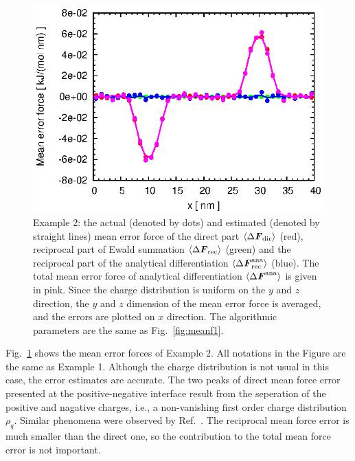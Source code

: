 \documentclass[aps,pre,preprint]{revtex4}
\renewcommand{\v}[1]{\textbf{\textit{#1}}}
\begin{document}
\begin{figure}
  \centering
  \includegraphics[]{fig/error.two_peaks_sep.box40x20x20.b1.000.r3.00.n6.K101x051x051/fig.ana.ewald.meanf.eps}
  \caption{Example 2: the actual (denoted by dots) and estimated
    (denoted by straight lines) mean error force of the direct part
    $\langle\Delta \v F_{\textrm{dir}}\rangle$ (red), reciprocal part
    of Ewald summation $\langle\Delta \v F_{\textrm{rec}}\rangle$
    (green) and the reciprocal part of the analytical differentiation
    $\langle\Delta \v F^{\textrm{ana}}_{\textrm{rec}}\rangle$
    (blue). The total mean error force of analytical differentiation
    $\langle\Delta \v F^{\textrm{ana}}\rangle$ is given in pink.
    Since the charge distribution is uniform on the $y$ and $z$
    direction, the $y$ and $z$ dimension of the mean error force is
    averaged, and the errors are plotted on $x$ direction. The
    algorithmic parameters are the same as Fig.~\ref{fig:meanf1}.}
  \label{fig:meanf2}
\end{figure}

Fig.~\ref{fig:meanf2} shows the mean error forces of Example 2. All
notations in the Figure are the same as Example 1.  Although the
charge distribution is not usual in this case, the error estimates are
accurate. The two peaks of direct mean force error presented at the
positive-negative interface result from the seperation of the positive
and nagative charges, i.e., a non-vanishing first order charge
distribution $\rho_q$.  Similar phenomena were observed by
Ref.~\cite{wang2012}. The reciprocal mean force error is much smaller
than the direct one, so the contribution to the total mean force error
is not important.
\end{document}

